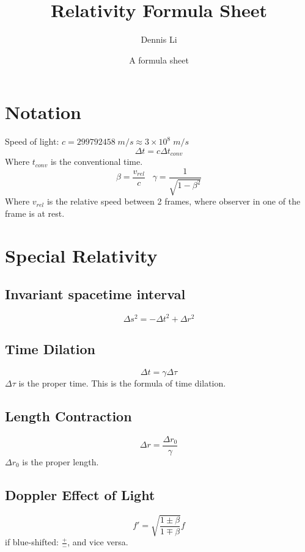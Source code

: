 \documentclass[12pt]{article}
\title{Relativity Formula Sheet}
\author{Dennis Li}
\date{A formula sheet}
\begin{document}
\maketitle


\section*{Notation}
Speed of light: $c = 299792458 \; m/s \approx 3\times 10^{8}\; m/s$\\
\[
\Delta t = c\Delta t_{conv}
\]
Where $t_{conv}$ is the conventional time.
\[
\beta = \frac{v_{rel}}{c} \;\;\; \gamma = \frac{1}{\sqrt{1-\beta^2}}
\]
Where $v_{rel}$ is the relative speed between 2 frames, where observer in one of the frame is at rest.



\section{Special Relativity}
\subsection{Invariant spacetime interval}
\[
\Delta s^2 = -\Delta t^2 + \Delta r^2
\]
\subsection{Time Dilation}
\[
\Delta t = \gamma \Delta \tau
\]
$\Delta \tau $ is the proper time. This is the formula of time dilation. 

\subsection{Length Contraction}
\[
\Delta r = \frac{\Delta r_0}{\gamma}
\]
$\Delta r_0$ is the proper length.
\subsection{Doppler Effect of Light}
\[
f' = \sqrt{\frac{1\pm\beta}{1\mp \beta}}f
\]
if blue-shifted: $\frac{+}{-}$, and vice versa.
\end{document}
